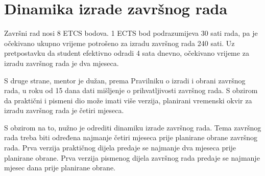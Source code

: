 \section{Dinamika izrade završnog rada}
Završni rad nosi 8 ETCS bodova. 1 ECTS bod podrazumijeva 30 sati rada, pa je očekivano ukupno vrijeme potrošeno za izradu završnog rada 240 sati. 
Uz pretpostavku da student efektivno odradi 4 sata dnevno, očekivano vrijeme za izradu završnog rada je dva mjeseca.

S druge strane, mentor je dužan, prema Pravilniku o izradi i obrani završnog rada, u roku od 15 dana dati mišljenje o prihvatljivosti završnog rada. 
S obzirom da praktični i pismeni dio može imati više verzija, planirani vremenski okvir za izradu završnog rada je četiri mjeseca. 

S obzirom na to, nužno je odrediti dinamiku izrade završnog rada. Tema završnog rada treba biti određena najmanje četiri mjeseca prije planirane obrane 
završnog rada. Prva verzija praktičnog dijela predaje se najmanje dva mjeseca prije planirane obrane. Prva verzija pismenog dijela završnog rada predaje 
se najmanje mjesec dana prije planirane obrane.

